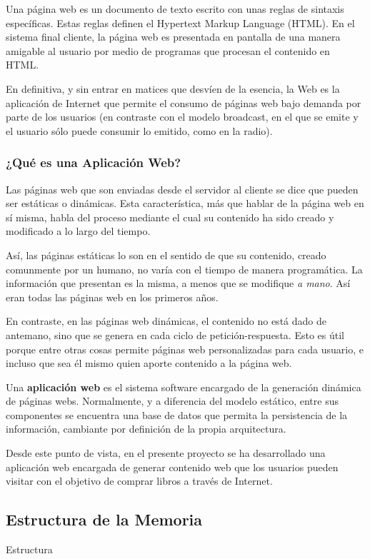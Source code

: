 \documentclass[a4paper]{report}
\begin{document}
    Una página web es un documento de texto escrito con unas reglas de sintaxis específicas. Estas reglas definen el Hypertext Markup Language (HTML). En el sistema final cliente, la página web es presentada en pantalla de una manera amigable al usuario por medio de programas que procesan el contenido en HTML.
    
    En definitiva, y sin entrar en matices que desvíen de la esencia, la Web es la aplicación de Internet que permite el consumo de páginas web bajo demanda por parte de los usuarios (en contraste con el modelo broadcast, en el que se emite y el usuario sólo puede consumir lo emitido, como en la radio).
    
    \subsubsection{¿Qué es una Aplicación Web?}
    Las páginas web que son enviadas desde el servidor al cliente se dice que pueden ser estáticas o dinámicas. Esta característica, más que hablar de la página web en sí misma, habla del proceso mediante el cual su contenido ha sido creado y modificado a lo largo del tiempo.
    
    Así, las páginas estáticas lo son en el sentido de que su contenido, creado comunmente por un humano, no varía con el tiempo de manera programática. La información que presentan es la misma, a menos que se modifique \emph{a mano}. Así eran todas las páginas web en los primeros años.
    
    En contraste, en las páginas web dinámicas, el contenido no está dado de antemano, sino que se genera en cada ciclo de petición-respuesta. Esto es útil porque entre otras cosas permite páginas web personalizadas para cada usuario, e incluso que sea él mismo quien aporte contenido a la página web.
    
    Una \textbf{aplicación web} es el sistema software encargado de la generación dinámica de páginas webs. Normalmente, y a diferencia del modelo estático, entre sus componentes se encuentra una base de datos que permita la persistencia de la información, cambiante por definición de la propia arquitectura.
    
    Desde este punto de vista, en el presente proyecto se ha desarrollado una aplicación web encargada de generar contenido web que los usuarios pueden visitar con el objetivo de comprar libros a través de Internet.

    \subsection{Estructura de la Memoria}
    Estructura
\end{document}
